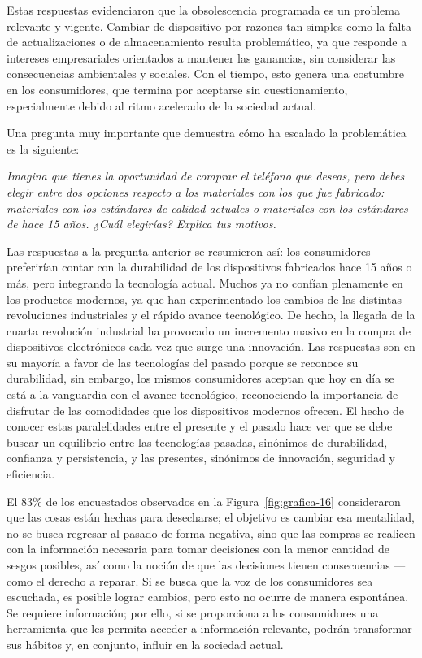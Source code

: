 Estas respuestas evidenciaron que la obsolescencia programada es un problema
relevante y vigente. Cambiar de dispositivo por razones tan simples como la
falta de actualizaciones o de almacenamiento resulta problemático, ya que
responde a intereses empresariales orientados a mantener las ganancias, sin
considerar las consecuencias ambientales y sociales. Con el tiempo, esto genera
una costumbre en los consumidores, que termina por aceptarse sin
cuestionamiento, especialmente debido al ritmo acelerado de la sociedad actual.

Una pregunta muy importante que demuestra cómo ha escalado la problemática es la
siguiente:

\noindent \textit{Imagina que tienes la oportunidad de comprar el teléfono que
deseas, pero debes elegir entre dos opciones respecto a los materiales con los
que fue fabricado: materiales con los estándares de calidad actuales o
materiales con los estándares de hace 15 años. ¿Cuál elegirías?  Explica tus
motivos.}

Las respuestas a la pregunta anterior se resumieron así: los consumidores
preferirían contar con la durabilidad de los dispositivos fabricados hace 15
años o más, pero integrando la tecnología actual. Muchos ya no confían
plenamente en los productos modernos, ya que han experimentado los cambios de
las distintas revoluciones industriales y el rápido avance tecnológico. De
hecho, la llegada de la cuarta revolución industrial ha provocado un incremento
masivo en la compra de dispositivos electrónicos cada vez que surge una
innovación. Las  respuestas son en su mayoría a favor de las tecnologías del
pasado porque se reconoce su durabilidad, sin embargo, los mismos consumidores
aceptan que hoy en día se está a la vanguardia con el avance tecnológico,
reconociendo la importancia de disfrutar de las comodidades que los dispositivos
modernos ofrecen. El hecho de conocer estas paralelidades entre el presente y el
pasado hace ver que se debe buscar un equilibrio entre las tecnologías pasadas,
sinónimos de durabilidad, confianza y persistencia, y las presentes, sinónimos
de innovación, seguridad y eficiencia.

El 83\% de los encuestados observados en la Figura~\ref{fig:grafica-16}
consideraron que las cosas están hechas para desecharse; el objetivo es
cambiar esa mentalidad, no se busca regresar al pasado de forma negativa, sino
que las compras se realicen con la información necesaria para tomar decisiones
con la menor cantidad de sesgos posibles, así como la noción de que las
decisiones tienen consecuencias —como el derecho a reparar. Si se busca que la
voz de los consumidores sea escuchada, es posible lograr cambios, pero esto no
ocurre de manera espontánea. Se requiere información; por ello, si se
proporciona a los consumidores una herramienta que les permita acceder a
información relevante, podrán transformar sus hábitos y, en conjunto, influir
en la sociedad actual.

